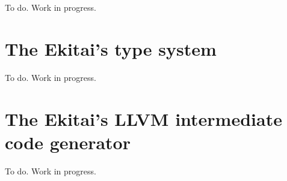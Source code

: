 \documentclass[
    oneside,
    english,
    coorientadorbanca,
    embeddedlogo,
    noabntexcite
]{ufsc-thesis-rn46-2019}
\begin{document}
To do. Work in progress.

\section{The Ekitai's type system}

To do. Work in progress.

\section{The Ekitai's LLVM intermediate code generator}

To do. Work in progress.


\postextual{}
\printbibliography{}
\end{document}
